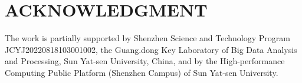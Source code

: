 \section*{ACKNOWLEDGMENT}

The work is partially supported by Shenzhen Science and Technology Program JCYJ20220818103001002, the Guang.dong Key Laboratory of Big Data Analysis and Processing, Sun Yat-sen University, China, and by the High-performance Computing Public Platform (Shenzhen Campus) of Sun Yat-sen University.
